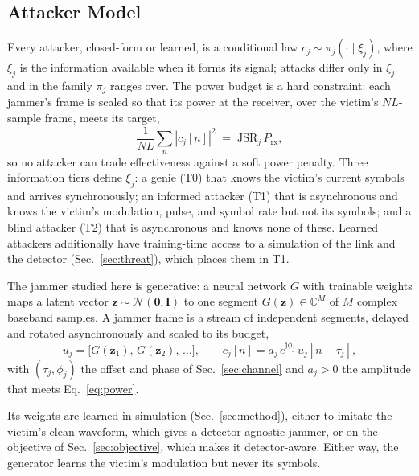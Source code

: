 \documentclass[conference]{IEEEtran}
\begin{document}
\subsection{Attacker Model}
\label{sec:attacker}
Every attacker, closed-form or learned, is a conditional law $c_j\sim\pi_j(\cdot\mid\xi_j)$, where $\xi_j$ is the information available when it forms its signal; attacks differ only in $\xi_j$ and in the family $\pi_j$ ranges over.
The power budget is a hard constraint: each jammer's frame is scaled so that its power at the receiver, over the victim's $NL$-sample frame, meets its target,
\begin{equation}
\frac{1}{N L}\sum_{n}|c_j[n]|^2 \;=\; \mathrm{JSR}_j\,P_{\mathrm{rx}},
\label{eq:power}
\end{equation}
so no attacker can trade effectiveness against a soft power penalty.
Three information tiers define $\xi_j$: a genie (T0) that knows the victim's current symbols and arrives synchronously; an informed attacker (T1) that is asynchronous and knows the victim's modulation, pulse, and symbol rate but not its symbols; and a blind attacker (T2) that is asynchronous and knows none of these.
Learned attackers additionally have training-time access to a simulation of the link and the detector (Sec.~\ref{sec:threat}), which places them in T1.

The jammer studied here is generative: a neural network $G$ with trainable weights maps a latent vector $\mathbf{z}\sim\mathcal{N}(\mathbf{0},\mathbf{I})$ to one segment $G(\mathbf{z})\in\mathbb{C}^{M}$ of $M$ complex baseband samples.
A jammer frame is a stream of independent segments, delayed and rotated asynchronously and scaled to its budget,
\begin{equation}
u_j=\bigl[G(\mathbf{z}_1),\,G(\mathbf{z}_2),\,\ldots\bigr],\qquad c_j[n]=a_j\,e^{\mathrm{j}\phi_j}\,u_j[n-\tau_j],
\label{eq:gan}
\end{equation}
with $(\tau_j,\phi_j)$ the offset and phase of Sec.~\ref{sec:channel} and $a_j>0$ the amplitude that meets Eq.~\eqref{eq:power}.

Its weights are learned in simulation (Sec.~\ref{sec:method}), either to imitate the victim's clean waveform, which gives a detector-agnostic jammer, or on the objective of Sec.~\ref{sec:objective}, which makes it detector-aware.
Either way, the generator learns the victim's modulation but never its symbols.
\end{document}
